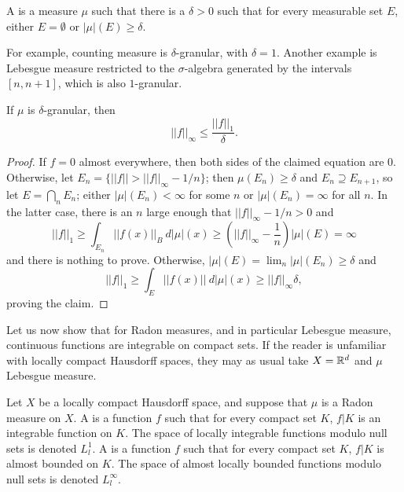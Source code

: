 \begin{definition}
A  is a measure $\mu$ such that there is a $\delta > 0$ such that for every measurable set $E$, either $E = \emptyset$ or $|\mu|(E) \geq \delta$.
\end{definition}

\begin{subsec}
For example, counting measure is $\delta$-granular, with $\delta = 1$.
Another example is Lebesgue measure restricted to the $\sigma$-algebra generated by the intervals $[n, n+1]$, which is also $1$-granular.
\end{subsec}

\begin{lemma}
If $\mu$ is $\delta$-granular, then
\[||f||_{\infty} \leq \frac{||f||_{1}}{\delta}.\]
\end{lemma}
\begin{proof}
If $f = 0$ almost everywhere, then both sides of the claimed equation are $0$.
Otherwise, let $E_{n} = \{||f|| > ||f||_{\infty} - 1/n\}$; then $\mu(E_{n}) \geq \delta$ and $E_{n} \supseteq E_{n+1}$, so let $E = \bigcap_{n} E_{n}$; either $|\mu|(E_{n}) < \infty$ for some $n$ or $|\mu|(E_{n}) = \infty$ for all $n$.
In the latter case, there is an $n$ large enough that $||f||_{\infty} - 1/n > 0$ and
\[||f||_{1} \geq \int_{E_{n}} ||f(x)||_{B} ~d|\mu|(x) \geq (||f||_{\infty} - \frac{1}{n}) |\mu|(E) = \infty\]
and there is nothing to prove. Otherwise, $|\mu|(E) = \lim_{n} |\mu|(E_{n}) \geq \delta$ and
\[||f||_{1} \geq \int_{E} ||f(x)||~d|\mu|(x) \geq ||f||_{\infty} \delta,\]
proving the claim.
\end{proof}

\begin{subsec}
Let us now show that for Radon measures, and in particular Lebesgue measure, continuous functions are integrable on compact sets.
If the reader is unfamiliar with locally compact Hausdorff spaces, they may as usual take $X = \mathbb{R}^{d}$ and $\mu$ Lebesgue measure.
\end{subsec}

\begin{definition}
Let $X$ be a locally compact Hausdorff space, and suppose that $\mu$ is a Radon measure on $X$.
A  is a function $f$ such that for every compact set $K$, $f|K$ is an integrable function on $K$.
The space of locally integrable functions modulo null sets is denoted $L^{1}_{l}$.
A  is a function $f$ such that for every compact set $K$, $f|K$ is almost bounded on $K$.
The space of almost locally bounded functions modulo null sets is denoted $L^{\infty}_{l}$.
\end{definition}

